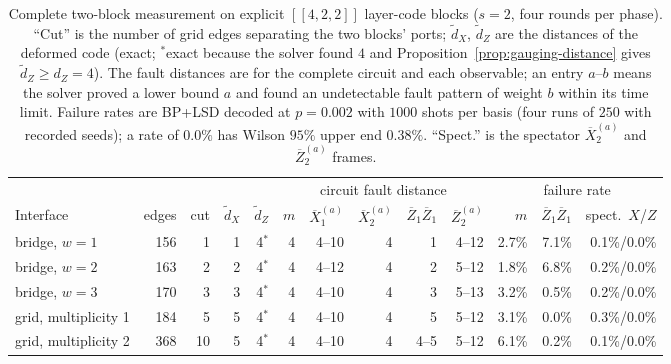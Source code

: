 \documentclass[aps,prx,reprint,superscriptaddress,nofootinbib,floatfix,longbibliography]{revtex4-2}
\theoremstyle{definition}
\begin{document}
\begin{table}[t]
\caption{Complete two-block measurement on explicit $[[4,2,2]]$ layer-code
blocks ($s=2$, four rounds per phase).  ``Cut'' is the number of grid edges
separating the two blocks' ports; $\widetilde d_X$, $\widetilde d_Z$ are the
distances of the deformed code (exact; $^\ast$exact because the solver found
$4$ and Proposition~\ref{prop:gauging-distance} gives
$\widetilde d_Z\ge d_Z=4$).  The fault distances are for the complete
circuit and each observable; an entry $a$--$b$ means the solver proved a lower
bound $a$ and found an undetectable fault pattern of weight $b$ within its
time limit.  Failure rates are BP+LSD decoded at $p=0.002$ with
$1000$ shots per basis (four runs of $250$ with recorded seeds); a rate of
$0.0\%$ has Wilson $95\%$ upper end $0.38\%$.  ``Spect.'' is the spectator
$\overline X_2^{(a)}$ and $\overline Z_2^{(a)}$ frames.}
\label{tab:two-block}
\centering
\scriptsize
\setlength{\tabcolsep}{3.5pt}
\begin{tabular}{@{}lrrrrrrrrrrrr@{}}
\toprule
 & & & & & \multicolumn{5}{c}{circuit fault distance} & \multicolumn{3}{c}{failure rate} \\
\cmidrule(lr){6-10}\cmidrule(l){11-13}
Interface & edges & cut & $\widetilde d_X$ & $\widetilde d_Z$ & $m$ & $\overline X_1^{(a)}$ & $\overline X_2^{(a)}$ & $\overline Z_1\overline Z_1$ & $\overline Z_2^{(a)}$ & $m$ & $\overline Z_1\overline Z_1$ & spect.\ $X$/$Z$ \\
\midrule
bridge, $w=1$ & 156 & 1 & 1 & 4$^{\ast}$ & 4 & 4--10 & 4 & 1 & 4--12 & 2.7\% & 7.1\% & 0.1\%/0.0\% \\
bridge, $w=2$ & 163 & 2 & 2 & 4$^{\ast}$ & 4 & 4--12 & 4 & 2 & 5--12 & 1.8\% & 6.8\% & 0.2\%/0.0\% \\
bridge, $w=3$ & 170 & 3 & 3 & 4$^{\ast}$ & 4 & 4--10 & 4 & 3 & 5--13 & 3.2\% & 0.5\% & 0.2\%/0.0\% \\
grid, multiplicity 1 & 184 & 5 & 5 & 4$^{\ast}$ & 4 & 4--10 & 4 & 5 & 5--12 & 3.1\% & 0.0\% & 0.3\%/0.0\% \\
grid, multiplicity 2 & 368 & 10 & 5 & 4$^{\ast}$ & 4 & 4--10 & 4 & 4--5 & 5--12 & 6.1\% & 0.2\% & 0.1\%/0.0\% \\
\bottomrule
\end{tabular}
\end{table}
\end{document}
